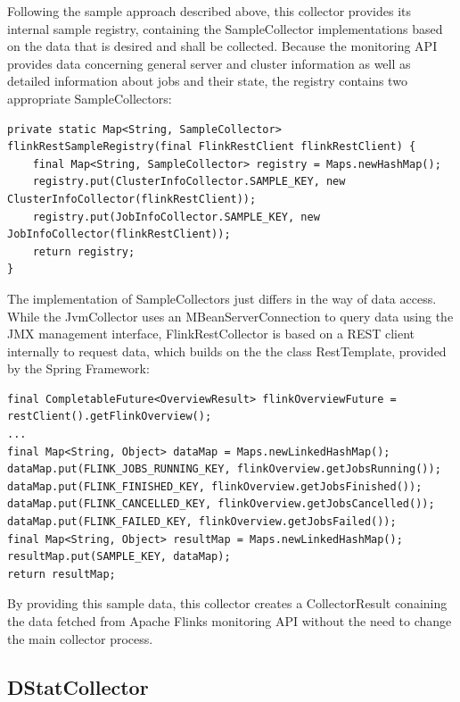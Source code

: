 Following the sample approach described above, this collector provides its internal sample registry, containing the SampleCollector
implementations based on the data that is desired and shall be collected. Because the monitoring API provides data concerning
general server and cluster information as well as detailed information about jobs and their state, the registry contains
two appropriate SampleCollectors:

\begin{lstlisting}[caption={"FlinkRestCollector" Sample registry}, captionpos=b, label={lst:flink-rest-collector-sample-registry}]
private static Map<String, SampleCollector> flinkRestSampleRegistry(final FlinkRestClient flinkRestClient) {
    final Map<String, SampleCollector> registry = Maps.newHashMap();
    registry.put(ClusterInfoCollector.SAMPLE_KEY, new ClusterInfoCollector(flinkRestClient));
    registry.put(JobInfoCollector.SAMPLE_KEY, new JobInfoCollector(flinkRestClient));
    return registry;
}
\end{lstlisting}

The implementation of SampleCollectors just differs in the way of data access. While the JvmCollector uses an MBeanServerConnection
to query data using the JMX management interface, FlinkRestCollector is based on a REST client internally to request data, which builds
on the the class RestTemplate, provided by the Spring Framework:

\begin{lstlisting}[caption={"FlinkRestCollector" Rest client}, captionpos=b, label={lst:flink-rest-collector-client}]
final CompletableFuture<OverviewResult> flinkOverviewFuture = restClient().getFlinkOverview();
...
final Map<String, Object> dataMap = Maps.newLinkedHashMap();
dataMap.put(FLINK_JOBS_RUNNING_KEY, flinkOverview.getJobsRunning());
dataMap.put(FLINK_FINISHED_KEY, flinkOverview.getJobsFinished());
dataMap.put(FLINK_CANCELLED_KEY, flinkOverview.getJobsCancelled());
dataMap.put(FLINK_FAILED_KEY, flinkOverview.getJobsFailed());
final Map<String, Object> resultMap = Maps.newLinkedHashMap();
resultMap.put(SAMPLE_KEY, dataMap);
return resultMap;
\end{lstlisting}

By providing this sample data, this collector creates a CollectorResult conaining the data fetched from Apache Flinks monitoring
API without the need to change the main collector process.

\subsection{DStatCollector}

